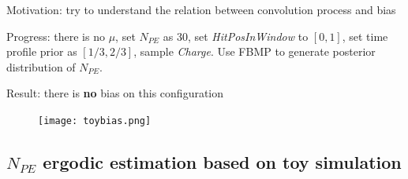 \documentclass[notitlepage]{article}
\begin{document}
Motivation: try to understand the relation between convolution process and bias

Progress: there is no $\mu$, set $N_{PE}$ as 30, set \textit{HitPosInWindow} to $[0, 1]$, set time profile prior as $[1/3, 2/3]$, sample \textit{Charge}. Use FBMP to generate posterior distribution of $N_{PE}$. 

Result: there is \textbf{no} bias on this configuration

\begin{figure}[H]
    \centering
    \texttt{[image: toybias.png]}
\end{figure}

\subsection{$N_{PE}$ ergodic estimation based on toy simulation}
\end{document}
